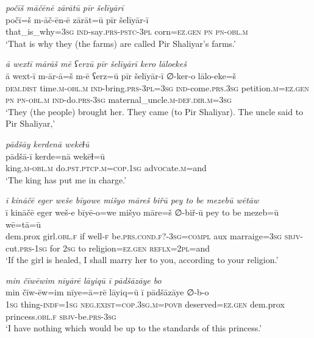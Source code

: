 \ea \label{ZP.96}
\textit{počīš māčēnē zārātū pīr šelīyārī} \\ 
\gll počī=š m-āč-ēn-ē zārāt=ū pīr šelīyār-ī \\ 
 that\_is\_why\textsc{=3sg} \textsc{ind-}say\textsc{.prs}\textsc{-pstc}\textsc{-3pl} corn\textsc{\textsc{=ez.gen}} \textsc{pn} \textsc{pn}\textsc{-obl}\textsc{.m} \\ 
\glt `That is why they (the farms) are called Pir Shaliyar’s farms.'
\z 
 
\ea \label{ZP.97}
\textit{ā wextī mārāš mē ʕerzū pīr šelīyārī kero lāloekeš} \\ 
\gll ā wext-ī m-ār-ā=š m-ē ʕerz=ū pīr šelīyār-ī ∅-ker-o lālo-eke=š \\ 
 \textsc{dem.dist} time\textsc{.m}\textsc{-obl}\textsc{.m} \textsc{ind-}bring\textsc{.prs}\textsc{-3pl}\textsc{=3sg} \textsc{ind-}come\textsc{.prs}\textsc{.3sg} petition\textsc{.m}\textsc{\textsc{=ez.gen}} \textsc{pn} \textsc{pn}\textsc{-obl}\textsc{.m} \textsc{ind-}do\textsc{.prs}\textsc{-3sg} maternal\_uncle\textsc{.m}\textsc{-def}\textsc{.dir}\textsc{.m}\textsc{=3sg} \\ 
\glt `They (the people) brought her. They came (to Pir Shaliyar). The uncle said to Pir Shaliyar,'
\z 
 
\ea \label{ZP.99}
\textit{pādšāy kerdenā wekēɫū} \\ 
\gll pādšā-ī kerde=nā wekēɫ=ū \\ 
 king\textsc{.m}\textsc{-obl}\textsc{.m} do\textsc{.pst}\textsc{.ptcp}\textsc{.m}\textsc{=cop}\textsc{.\textsc{1sg}} ad\textsc{voc}ate\textsc{.m}=and \\ 
\glt `The king has put me in charge.'
\z 
 
\ea \label{ZP.100}
\textit{ī kināčē eger weše bīyowe mišyo māreš biřū pey to be mezebū wētāw} \\ 
\gll ī kināčē eger weš-e bīyē-o=we mišyo māre=š ∅-biř-ū pey to be mezeb=ū wē=tā=ū \\ 
 dem.prox girl\textsc{.obl}\textsc{.f} if well\textsc{-f} be\textsc{.prs}.\textsc{cond}\textsc{.f}?\textsc{-3sg}\textsc{=compl} aux marraige\textsc{=3sg} \textsc{sbjv-}cut\textsc{.prs}\textsc{-\textsc{1sg}} for \textsc{2sg} to religion\textsc{\textsc{=ez.gen}} \textsc{reflx}=\textsc{2pl}=and \\ 
\glt `If the girl is healed, I shall marry her to you, according to your religion.'
\z 
 
\ea \label{ZP.105}
\textit{min čīwēwim nīyārē lāyiqū ī pādšāzāye bo} \\ 
\gll min čīw-ēw=im nīye=ā=rē lāyiq=ū ī pādšāzāye ∅-b-o \\ 
 \textsc{1sg} thing\textsc{-indf}\textsc{=\textsc{1sg}} \textsc{\textsc{neg.}exist}\textsc{=cop}\textsc{.3sg}\textsc{.m}\textsc{=\textsc{povb}} deserved\textsc{\textsc{=ez.gen}} dem.prox princess\textsc{.obl}\textsc{.f} \textsc{sbjv-}be\textsc{.prs}\textsc{-3sg} \\ 
\glt `I have nothing which would be up to the standards of this princess.'
\z 
 
